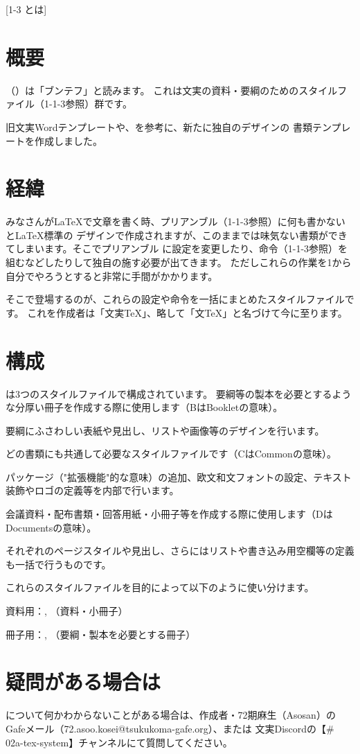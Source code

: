\newpage
\pagestyle{leaflet}
[1-3 \BunTeX とは]
\inserttitlespace
\begin{multicols*}{2}
\section{概要}
\BunTeX （\BunTeXJ ）は「ブンテフ」と読みます。
これは文実の資料・要綱のためのスタイルファイル（1-1-3参照）群です。

旧文実Wordテンプレートや、を参考に、新たに独自のデザインの
書類テンプレートを作成しました。

\section{経緯}
みなさんが\LaTeX で文章を書く時、プリアンブル（1-1-3参照）に何も書かないと\LaTeX 標準の
デザインで作成されますが、このままでは味気ない書類ができてしまいます。そこでプリアンブル
に設定を変更したり、命令（1-1-3参照）を組むなどしたりして独自の施す必要が出てきます。
ただしこれらの作業を1から自分でやろうとすると非常に手間がかかります。

そこで登場するのが、これらの設定や命令を一括にまとめたスタイルファイルです。
これを作成者は「文実\TeX 」、略して「文\TeX 」と名づけて今に至ります。

\section{構成}
\BunTeX は3つのスタイルファイルで構成されています。
要綱等の製本を必要とするような分厚い冊子を作成する際に使用します（BはBookletの意味）。

要綱にふさわしい表紙や見出し、リストや画像等のデザインを行います。

どの書類にも共通して必要なスタイルファイルです（CはCommonの意味）。

パッケージ（"拡張機能"的な意味）の追加、欧文和文フォントの設定、テキスト装飾やロゴの定義等を内部で行います。

会議資料・配布書類・回答用紙・小冊子等を作成する際に使用します（DはDocumentsの意味）。

それぞれのページスタイルや見出し、さらにはリストや書き込み用空欄等の定義も一括で行うものです。

これらのスタイルファイルを目的によって以下のように使い分けます。
\begin{framebox-key}
\begin{reitemize}
    \item 資料用\BunTeX ：\BunTeXC , \BunTeXD（資料・小冊子）
    \item 冊子用\BunTeX ：\BunTeXB , \BunTeXC（要綱・製本を必要とする冊子）
\end{reitemize}
\end{framebox-key}

\section{疑問がある場合は}
\BunTeX について何かわからないことがある場合は、作成者・72期麻生（Asosan）のGafeメール（72.asoo.kosei@tsukukoma-gafe.org）、または
文実Discordの【\# 02a-tex-system】チャンネルにて質問してください。

\end{multicols*}